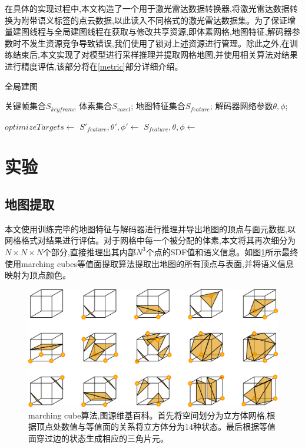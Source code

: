 在具体的实现过程中,本文构造了一个用于激光雷达数据转换器,将激光雷达数据转换为附带语义标签的点云数据,以此读入不同格式的激光雷达数据集。为了保证增量建图线程与全局建图线程在获取与修改共享资源,即体素网格,地图特征,解码器参数时不发生资源竞争导致错误,我们使用了锁对上述资源进行管理。除此之外,在训练结束后,本文实现了对模型进行采样推理并提取网格地图,并使用相关算法对结果进行精度评估,该部分将在\ref{metric}部分详细介绍。
\begin{algorithm}
    \caption{全局建图}\label{globalmapping}
    \begin{algorithmic}[1]
      \Require
        关键帧集合$S_{keyframe}$
      \Ensure
        体素集合$S_{voxel}$;
        地图特征集合$S_{feature}$;
        解码器网络参数$\theta, \phi$;
        
      \State$optimizeTargets\gets$
      \State $S'_{feature}, \theta', \phi'\gets$
      \State $S_{feature},\theta,\phi\gets$
      \State {}
      \EndFunction
    \end{algorithmic}
\end{algorithm}
\clearpage
\section{实验}\label{numerical experiments}
\subsection{地图提取}
本文使用训练完毕的地图特征与解码器进行推理并导出地图的顶点与面元数据,以网格格式对结果进行评估。对于网格中每一个被分配的体素,本文将其再次细分为$N \times N \times N$个部分,直接推理出其内部$N^3$个点的SDF值和语义信息。如图\ref{marching}所示最终使用marching cubes\cite{marchingcubes}等值面提取算法提取出地图的所有顶点与表面,并将语义信息映射为顶点颜色。
\begin{figure}[htbp]
    \centering
    \includegraphics[scale=0.7]{figures/MarchingCubes.png}
    \caption{marching cube算法,图源维基百科\cite{marchingpicture}。首先将空间划分为立方体网格,根据顶点处数值与等值面的关系将立方体分为14种状态。最后根据等值面穿过边的状态生成相应的三角片元。}\label{marching}
\end{figure}
